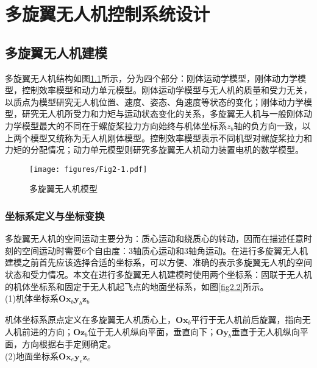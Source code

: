 
\chapter{多旋翼无人机控制系统设计}
\label{chap:control design}

\section{多旋翼无人机建模}
多旋翼无人机结构如图\ref{fig2.1}所示，分为四个部分：刚体运动学模型，刚体动力学模型，控制效率模型和动力单元模型\upcite{[2.1]}。刚体运动学模型与无人机的质量和受力无关，以质点为模型研究无人机位置、速度、姿态、角速度等状态的变化；刚体动力学模型，研究无人机所受力和力矩与运动状态变化的关系，多旋翼无人机与一般刚体动力学模型最大的不同在于螺旋桨拉力方向始终与机体坐标系$z_b$轴的负方向一致，以上两个模型又统称为无人机刚体模型。控制效率模型表示不同机型对螺旋桨拉力和力矩的分配情况；动力单元模型则研究多旋翼无人机动力装置电机的数学模型。
\begin{figure}[h]
\centering
\texttt{[image: figures/Fig2-1.pdf]}
\caption{多旋翼无人机模型}
\label{fig2.1}
\end{figure}

\subsection{坐标系定义与坐标变换}
多旋翼无人机的空间运动主要分为：质心运动和绕质心的转动，因而在描述任意时刻的空间运动时需要6个自由度：3轴质心运动和3轴角运动。在进行多旋翼无人机建模之前首先应该选择合适的坐标系，可以方便、准确的表示多旋翼无人机的空间状态和受力情况\upcite{[2.2]}。本文在进行多旋翼无人机建模时使用两个坐标系：固联于无人机的机体坐标系和固定于无人机起飞点的地面坐标系，如图\ref{fig2.2}所示。\\
(1)机体坐标系$\boldsymbol{O} \boldsymbol{x}_b \boldsymbol{y}_b \boldsymbol{z}_b$

机体坐标系原点定义在多旋翼无人机质心上，$\boldsymbol{O} \boldsymbol{x}_b$平行于无人机前后旋翼，指向无人机前进的方向；$\boldsymbol{O} \boldsymbol{z}_b$位于无人机纵向平面，垂直向下；$\boldsymbol{O} \boldsymbol{y}_b$垂直于无人机纵向平面，方向根据右手定则确定。 \\ 
(2)地面坐标系$\boldsymbol{O} \boldsymbol{x}_e \boldsymbol{y}_e \boldsymbol{z}_e$

